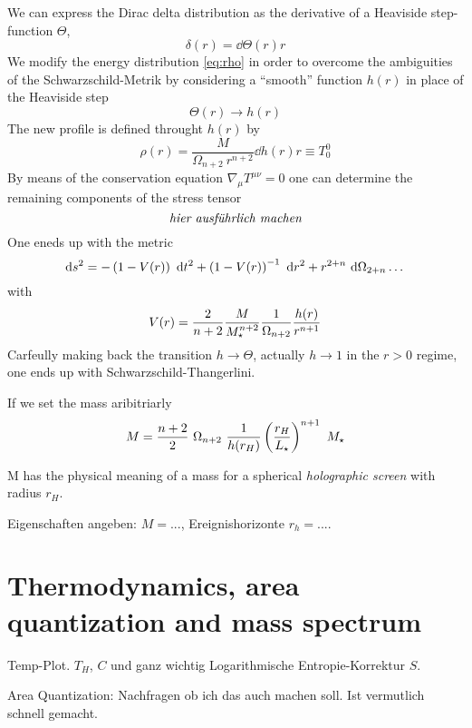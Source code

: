 \documentclass[10pt,a4paper, fleqn]{article}
\begin{document}
We can express the Dirac delta distribution as the derivative of
a Heaviside step-function $\Theta$,
\begin{equation}
\delta(r) = \dd {\Theta(r)} r
\end{equation}
%
We modify the energy distribution \eqref{eq:rho} in order to
overcome the ambiguities of the Schwarzschild-Metrik by considering
a ``smooth'' function $h(r)$ in place of the Heaviside step
\begin{equation}
\Theta(r) \to h(r)
\end{equation}
%
The new profile is defined throught $h(r)$ by
\begin{equation}
\rho(r) = \frac M {\Omega_{n+2}~r^{n+2}} \dd {h(r)}r \equiv T_0^0
\end{equation}
%
By means of the conservation equation $\nabla_\mu T^{\mu\nu} = 0$
one can determine the remaining components of the stress tensor \cite{Rizzo}
\begin{equation}
\text{\it hier ausführlich machen}
\end{equation}
One eneds up with the metric
\begin{equation}
\mathrm{d} s^2 = - \left(1 - V(r) \right)~\mathrm{d} t^2
+ \left(1 - V(r) \right)^{-1}~\mathrm{d} r^2 
+ r^{2+n}~\mathrm{d} \Omega_{2+n}\dots
\end{equation}
with
\begin{equation}
V(r) =  \frac{2}{n+2} \frac{M}{M_\star^{n+2}} {\frac{1}{\Omega_{n+2}}} \frac{h(r)}{r^{n+1}}
\end{equation}
Carfeully making back the transition $h\to\Theta$, actually
$h\to 1$ in the $r>0$ regime, one ends up
with Schwarzschild-Thangerlini.

If we set the mass aribitriarly
\begin{equation}
\label{eq:M}
M = \frac{n+2}{2} ~\Omega_{n+2}~ \frac{1}{h(r_H)} \left( \frac{r_H}{L_\star} \right)^{n+1} ~M_\star
\end{equation}

M has the physical meaning of a mass for a spherical
{\it holographic screen} with radius $r_H$.

Eigenschaften angeben: $M=...$, Ereignishorizonte $r_h = ...$.

\section{Thermodynamics, area quantization and mass spectrum}
Temp-Plot. $T_H$, $C$ und ganz wichtig Logarithmische Entropie-Korrektur $S$.

Area Quantization: Nachfragen ob ich das auch machen soll. Ist vermutlich schnell gemacht.
\end{document}
